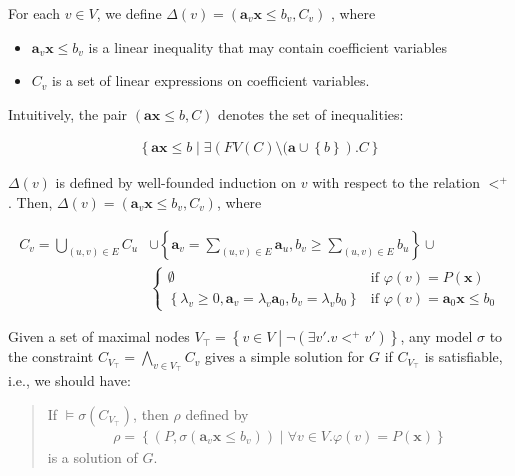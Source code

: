 \documentclass[a4paper,12pt]{article}
\begin{document}
For each $v \in V$, we define
$\Delta(v) = (\mathbf{a}_v \mathbf{x} \leq b_v, C_v)$
, where
\begin{itemize}
\item $\mathbf{a}_v \mathbf{x} \leq b_v$ is a linear inequality that
  may contain coefficient variables
\item $C_v$ is a set of linear expressions on coefficient variables.
\end{itemize}
Intuitively, the pair $(\mathbf{a} \mathbf{x} \leq b, C)$ denotes the
set of inequalities:

\begin{align*}
\left\lbrace
 \mathbf{a} \mathbf{x} \leq b \middle|
 \exists \left( FV(C)
  \setminus (\mathbf{a} \cup \left\lbrace b \right\rbrace
 \right). C
\right\rbrace
\end{align*}

$\Delta(v)$ is defined by well-founded induction on $v$ with respect
to the relation $<^+$. Then,
$\Delta(v) = \left( \mathbf{a}_v \mathbf{x} \leq b_v, C_v \right)$,
where

\begin{align*}
C_v =
\bigcup_{(u,v) \in E} C_u & \cup
\left\lbrace
 \mathbf{a}_v = \sum_{(u,v) \in E} \mathbf{a}_u,
 b_v \geq \sum_{(u,v) \in E} b_u
\right\rbrace \cup
\\
& \begin{cases}
\emptyset
& \mbox{if } \varphi(v) = P(\mathbf{x}) \\
\left\lbrace
 \lambda_v \geq 0, \mathbf{a}_v = \lambda_v \mathbf{a}_0,
 b_v = \lambda_v b_0
\right\rbrace
& \mbox{if } \varphi(v) = \mathbf{a}_0 \mathbf{x} \leq b_0
\end{cases}
\end{align*}

Given a set of maximal nodes
$V_\top = \left\lbrace v \in V \middle| \neg(\exists v'. v <^+ v') \right\rbrace$,
any model $\sigma$ to the constraint
$C_{V_\top} = \bigwedge_{v \in V_{\top}} C_v$ gives a
simple solution for $G$ if $C_{V_\top}$ is satisfiable, i.e., we
should have:

\begin{quote}
If $\models \sigma(C_{V_\top})$, then $\rho$ defined by
\begin{align*}
 \rho = \left\lbrace
  \left( P, \sigma(\mathbf{a}_v \mathbf{x} \leq b_v) \right) \middle|
  \forall v \in V. \varphi(v) = P(\mathbf{x})
 \right\rbrace
\end{align*}
is a solution of $G$.
\end{quote}
\end{document}
